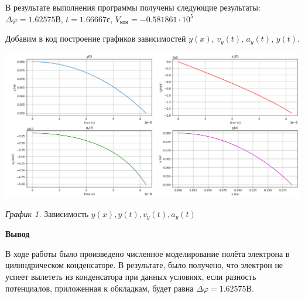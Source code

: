 \documentclass[12pt]{article}
\begin{document}
    В результате выполнения программы получены следующие результаты: $\Delta \varphi = 1.62575 \text{В}$, $t = 1.66667 \text{с}$, $V_{\text{кон}} = -0.581861 \cdot 10^5$

     Добавим в код построение графиков зависимостей $y(x)$, $v_y(t)$, $a_y(t)$, $y(t)$.

    \smallvspace

    \begin{center}
        \includegraphics[width=15cm]{images/Graphics.png}

        \smallvspace

        \textit{График 1.} Зависимость $y(x), y(t), v_y(t), a_y(t)$
    \end{center}

    \begin{flushleft}
       {\Large \textbf{Вывод}}
   \end{flushleft}

    В ходе работы было произведено численное моделирование полёта электрона в цилиндрическом конденсаторе. В результате, было получено, что электрон не успеет вылететь из конденсатора при данных условиях, если разность потенциалов, приложенная к обкладкам, будет равна $\Delta \varphi = 1.62575 \text{В}$.
\end{document}

